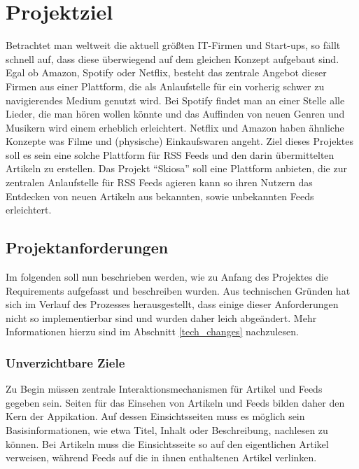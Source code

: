 
\chapter{Projektziel}

Betrachtet man weltweit die aktuell größten IT-Firmen und Start-ups, so fällt schnell auf, dass diese überwiegend auf dem gleichen Konzept aufgebaut sind.
Egal ob Amazon, Spotify oder Netflix, besteht das zentrale Angebot dieser Firmen aus einer Plattform, die als Anlaufstelle für ein vorherig schwer zu navigierendes Medium genutzt wird.
Bei Spotify findet man an einer Stelle alle Lieder, die man hören wollen könnte und das Auffinden von neuen Genren und Musikern wird einem erheblich erleichtert.
Netflix und Amazon haben ähnliche Konzepte was Filme und (physische) Einkaufswaren angeht.
Ziel dieses Projektes soll es sein eine solche Plattform für RSS Feeds und den darin übermittelten Artikeln zu erstellen.
Das Projekt ``Skiosa'' soll eine Plattform anbieten, die zur zentralen Anlaufstelle für RSS Feeds agieren kann so ihren Nutzern das Entdecken von neuen Artikeln aus bekannten, sowie unbekannten Feeds erleichtert.

\section{Projektanforderungen}
Im folgenden soll nun beschrieben werden, wie zu Anfang des Projektes die Requirements aufgefasst und beschreiben wurden.
Aus technischen Gründen hat sich im Verlauf des Prozesses herausgestellt, dass einige dieser Anforderungen nicht so implementierbar sind und wurden daher leich abgeändert.
Mehr Informationen hierzu sind im Abschnitt \ref{tech_changes} nachzulesen.

\subsection{Unverzichtbare Ziele}
Zu Begin müssen zentrale Interaktionsmechanismen für Artikel und Feeds gegeben sein.
Seiten für das Einsehen von Artikeln und Feeds bilden daher den Kern der Appikation.
Auf dessen Einsichtsseiten muss es möglich sein Basisinformationen, wie etwa Titel, Inhalt oder Beschreibung, nachlesen zu können.
Bei Artikeln muss die Einsichtsseite so auf den eigentlichen Artikel verweisen, während Feeds auf die in ihnen enthaltenen Artikel verlinken.

